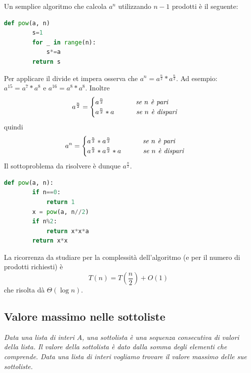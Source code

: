Un semplice algoritmo che calcola $a^n$ utilizzando $n - 1$ prodotti è il seguente:
\begin{lstlisting}[language=Python]
    def pow(a, n)
        s=1
        for _ in range(n):
            s*=a
        return s
\end{lstlisting}
Per applicare il divide et impera osserva che $a ^ n = a ^{\frac{n}{2}} * a ^{\frac{n}{2}}$. Ad esempio: $a ^{15} = a ^ 7 * a ^ 8$ e $a ^{16} = a ^ 8 * a ^ 8$. Inoltre
\begin{equation*}
a^{\frac{n}{2}}=
    \begin{cases}
        a^{\frac{n}{2}} \hspace{1.5cm} \textit{ se } n \textit{ è pari}\\
        a^{\frac{n}{2}}*a \hspace{1cm} \textit{ se } n \textit{ è dispari}
    \end{cases}
\end{equation*}
quindi 
\begin{equation*}
a^n=
    \begin{cases}
        a^{\frac{n}{2}}*a^{\frac{n}{2}} \hspace{1.5cm} \textit{ se } n \textit{ è pari}\\
        a^{\frac{n}{2}}*a^{\frac{n}{2}}*a \hspace{1cm} \textit{ se } n \textit{ è dispari}
    \end{cases}
\end{equation*}
Il sottoproblema da risolvere è dunque $a^{\frac{n}{2}}$.

\begin{lstlisting}[language=Python]
    def pow(a, n):
        if n==0:
            return 1
        x = pow(a, n//2)
        if n%2:
            return x*x*a
        return x*x
\end{lstlisting}
La ricorrenza da studiare per la complessità dell'algoritmo (e per il numero di prodotti richiesti) è
\begin{equation*}
    T(n) = T\left(\frac{n}{2}\right)+O(1)    
\end{equation*}
che risolta dà $\Theta(\log n)$.

\subsection{Valore massimo nelle sottoliste}
\textit{Data una lista di interi $A$, una sottolista è una sequenza consecutiva di valori della lista. Il valore della sottolista è dato dalla somma degli elementi che comprende. Data una lista di interi vogliamo trovare il valore massimo delle sue sottoliste.}

